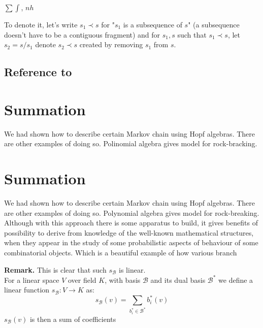 \documentclass[a4paper]{article}
\begin{document}
$\sum\!\!\!\!\!\int$, $n\!\!\!h$

To denote it, let's write $s_1 \prec s$ for "$s_1$ is a subsequence of $s$" (a subsequence doesn't have
to be a contiguous fragment) and for $s_1, s$
such that $s_1 \prec s$, let $s_2 = s / s_1$ denote $s_2 \prec s$ created by removing
$s_1$ from $s$.

\subsection{Reference to~\cite{Diaconis2014}}

\section{Summation}
We had shown how to describe certain Markov chain using Hopf algebras. There are other examples of doing so.
Polinomial algebra gives model for rock-bracking.

\section{Summation}
We had shown how to describe certain Markov chain using Hopf algebras. There are other examples of doing so.
Polynomial algebra gives model for rock-breaking. Although with this approach there is some apparatus
to build, it gives benefits of possibility to derive from knowledge of the well-known mathematical
structures, when they appear in the study of some probabilistic aspects of behaviour of some combinatorial
objects.
Which is a beautiful example of how various branch


\textbf{Remark.}
This is clear that such $s_\mathcal{B}$ is linear. \\

For a linear space $V$ over field $K$, with basis $\mathcal{B}$ and its dual basis $\mathcal{B}^*$
we define a linear function $s_\mathcal{B} : V \to K$ as:
\begin{equation*}
    s_\mathcal{B}(v)=\sum_{b_i^*\in\mathcal{B}^*}b_i^*(v)
\end{equation*}
$s_\mathcal{B}(v)$ is then a sum of coefficients
\end{document}
